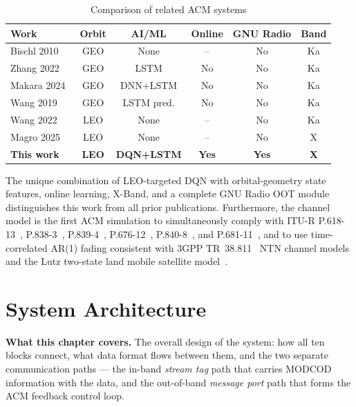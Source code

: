 \documentclass[12pt,a4paper]{report}
\begin{document}
\begin{table}[H]
\centering
\caption{Comparison of related ACM systems}
\label{tab:related_work}
\begin{tabular}{p{3.5cm}ccccc}
\toprule
\textbf{Work} & \textbf{Orbit} & \textbf{AI/ML} & \textbf{Online} &
\textbf{GNU Radio} & \textbf{Band} \\
\midrule
Bischl 2010~\cite{bischl2010}   & GEO & None       & --     & No  & Ka \\
Zhang 2022~\cite{zhang2022}     & GEO & LSTM       & No     & No  & Ka \\
Makara 2024~\cite{makara2024}   & GEO & DNN+LSTM   & No     & No  & Ka \\
Wang 2019~\cite{wang2019wcnc}   & GEO & LSTM pred. & No     & No  & Ka \\
Wang 2022~\cite{wang2022sensors}& LEO & None       & --     & No  & Ka \\
Magro 2025~\cite{magro2025}     & LEO & None       & --     & No  & X  \\
\textbf{This work}              & \textbf{LEO} & \textbf{DQN+LSTM} &
  \textbf{Yes} & \textbf{Yes} & \textbf{X} \\
\bottomrule
\end{tabular}
\end{table}

The unique combination of LEO-targeted DQN with orbital-geometry state features,
online learning, X-Band, and a complete GNU Radio OOT module distinguishes this
work from all prior publications. Furthermore, the channel model is the first
ACM simulation to simultaneously comply with ITU-R P.618-13~\cite{itu_p618},
P.838-3~\cite{itu_p838}, P.839-4~\cite{itu_p839}, P.676-12~\cite{itu_p676},
P.840-8~\cite{itu_p840}, and P.681-11~\cite{itu_p681}, and to use time-correlated
AR(1) fading consistent with 3GPP TR~38.811~\cite{3gpp_tr38811} NTN channel
models and the Lutz two-state land mobile satellite model~\cite{lutz1991}.

\chapter{System Architecture}

\begin{keyinsight}
\textbf{What this chapter covers.}
The overall design of the system: how all ten blocks connect, what data format
flows between them, and the two separate communication paths --- the in-band
\emph{stream tag} path that carries MODCOD information with the data, and the
out-of-band \emph{message port} path that forms the ACM feedback control loop.
\end{keyinsight}
\end{document}
